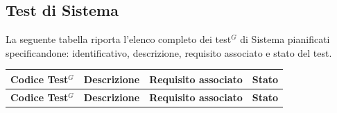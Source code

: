 \subsection{Test di Sistema}
La seguente tabella riporta l’elenco completo dei test$^G$ di Sistema pianificati specificandone: identificativo, descrizione, requisito associato e stato del test.
\renewcommand{\arraystretch}{1.2}
\begin{longtable}{|
		>{\raggedright\arraybackslash}p{} |
		>{\raggedright\arraybackslash}p{} |
		>{\raggedright\arraybackslash}p{} |
		>{\centering\arraybackslash}p{} |
	}
	\hline
	\rowcolor[gray]{0.9}
	\textbf{Codice Test$^G$} & \textbf{Descrizione} & \textbf{Requisito associato} & \textbf{Stato} \\
	\hline
	\endfirsthead
	
	\hline
	\rowcolor[gray]{0.9}
	\textbf{Codice Test$^G$} & \textbf{Descrizione} & \textbf{Requisito associato} & \textbf{Stato} \\
	\hline
	\endhead
	

\end{longtable}
